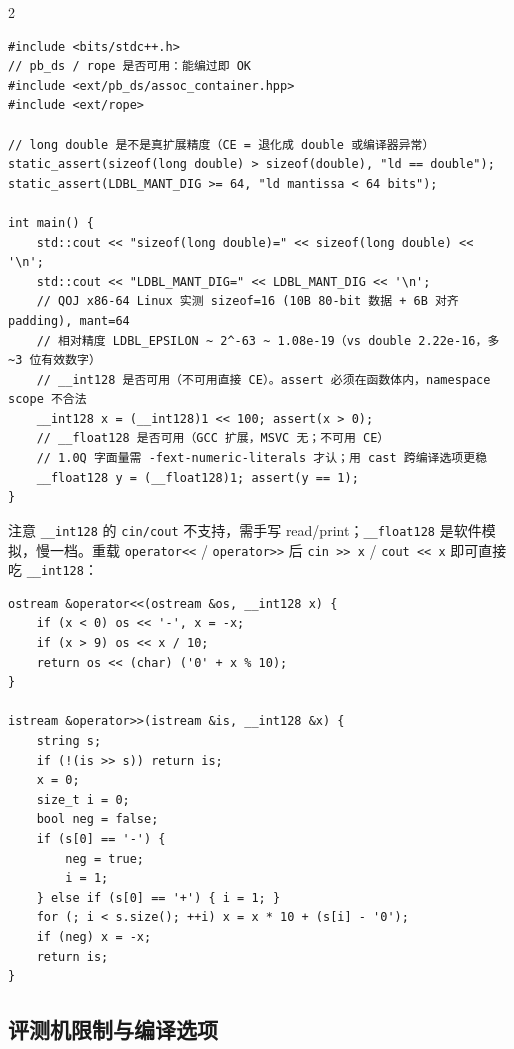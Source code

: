 \begin{multicols*}{2}

	\begin{verbatim}
#include <bits/stdc++.h>
// pb_ds / rope 是否可用：能编过即 OK
#include <ext/pb_ds/assoc_container.hpp>
#include <ext/rope>

// long double 是不是真扩展精度（CE = 退化成 double 或编译器异常）
static_assert(sizeof(long double) > sizeof(double), "ld == double");
static_assert(LDBL_MANT_DIG >= 64, "ld mantissa < 64 bits");

int main() {
    std::cout << "sizeof(long double)=" << sizeof(long double) << '\n';
    std::cout << "LDBL_MANT_DIG=" << LDBL_MANT_DIG << '\n';
    // QOJ x86-64 Linux 实测 sizeof=16 (10B 80-bit 数据 + 6B 对齐 padding), mant=64
    // 相对精度 LDBL_EPSILON ~ 2^-63 ~ 1.08e-19（vs double 2.22e-16，多 ~3 位有效数字）
    // __int128 是否可用（不可用直接 CE）。assert 必须在函数体内，namespace scope 不合法
    __int128 x = (__int128)1 << 100; assert(x > 0);
    // __float128 是否可用（GCC 扩展，MSVC 无；不可用 CE）
    // 1.0Q 字面量需 -fext-numeric-literals 才认；用 cast 跨编译选项更稳
    __float128 y = (__float128)1; assert(y == 1);
}
	\end{verbatim}

	注意 \texttt{\_\_int128} 的 \texttt{cin/cout} 不支持，需手写 read/print；\texttt{\_\_float128} 是软件模拟，慢一档。重载 \texttt{operator<<} / \texttt{operator>>} 后 \texttt{cin >> x} / \texttt{cout << x} 即可直接吃 \texttt{\_\_int128}：

	\begin{verbatim}
ostream &operator<<(ostream &os, __int128 x) {
    if (x < 0) os << '-', x = -x;
    if (x > 9) os << x / 10;
    return os << (char) ('0' + x % 10);
}

istream &operator>>(istream &is, __int128 &x) {
    string s;
    if (!(is >> s)) return is;
    x = 0;
    size_t i = 0;
    bool neg = false;
    if (s[0] == '-') {
        neg = true;
        i = 1;
    } else if (s[0] == '+') { i = 1; }
    for (; i < s.size(); ++i) x = x * 10 + (s[i] - '0');
    if (neg) x = -x;
    return is;
}
	\end{verbatim}

	\subsection{评测机限制与编译选项}


\end{multicols*}
